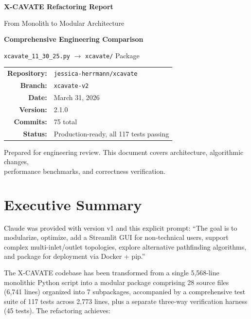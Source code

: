 \documentclass[11pt,a4paper]{article}
\newcommand{\original}{\texttt{xcavate\_11\_30\_25.py}}
\newcommand{\refactored}{\texttt{xcavate/}}
\begin{document}
\begin{titlepage}
\centering
\vspace*{2cm}
{\Huge\bfseries\color{accentblue} X-CAVATE Refactoring Report\par}
\vspace{0.5cm}
{\Large\color{accentblue!70!black} From Monolith to Modular Architecture\par}
\vspace{2cm}
{\large\bfseries Comprehensive Engineering Comparison\par}
\vspace{0.3cm}
{\large \original{} $\longrightarrow$ \refactored{} Package\par}
\vspace{3cm}
\begin{tabular}{rl}
\textbf{Repository:} & \texttt{jessica-herrmann/xcavate} \\
\textbf{Branch:} & \texttt{xcavate-v2} \\
\textbf{Date:} & March 31, 2026 \\
\textbf{Version:} & 2.1.0 \\
\textbf{Commits:} & 75 total \\
\textbf{Status:} & Production-ready, all 117 tests passing \\
\end{tabular}
\vfill
{\small Prepared for engineering review. This document covers architecture, algorithmic changes,\\performance benchmarks, and correctness verification.\par}
\end{titlepage}

\tableofcontents
\newpage

\section{Executive Summary}

Claude was provided with version v1 and this explicit prompt: ``The goal is to modularize, optimize, add a Streamlit GUI for non-technical users, support complex multi-inlet/outlet topologies, explore alternative pathfinding algorithms, and package for deployment via Docker + pip.''

The X-CAVATE codebase has been transformed from a single 5,568-line monolithic Python script into a modular package comprising 28 source files (6,741 lines) organized into 7 subpackages, accompanied by a comprehensive test suite of 117 tests across 2,773 lines, plus a separate three-way verification harness (45 tests). The refactoring achieves:
\end{document}
